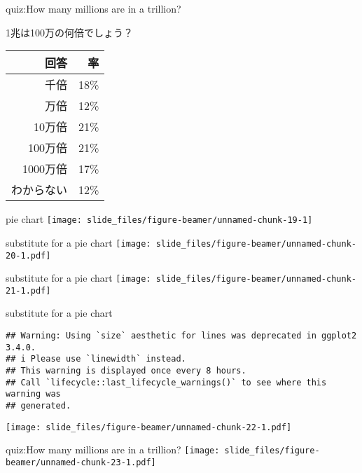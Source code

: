 \documentclass[
  ignorenonframetext,
]{beamer}
\begin{document}
\begin{frame}{quiz:How many millions are in a trillion?}
\protect\hypertarget{quizhow-many-millions-are-in-a-trillion-1}{}
\LARGE

1兆は100万の何倍でしょう？

\begin{tabular}{rr}\toprule
回答&率\\\midrule
千倍&18\%\\
万倍&12\%\\
10万倍&21\%\\
100万倍&21\%\\
1000万倍&17\%\\
わからない&12\%\\\bottomrule
\end{tabular}
\end{frame}

\begin{frame}{pie chart}
\protect\hypertarget{pie-chart}{}
\texttt{[image: slide\_files/figure-beamer/unnamed-chunk-19-1]}
\end{frame}

\begin{frame}{substitute for a pie chart}
\protect\hypertarget{substitute-for-a-pie-chart}{}
\texttt{[image: slide\_files/figure-beamer/unnamed-chunk-20-1.pdf]}
\end{frame}

\begin{frame}{substitute for a pie chart}
\protect\hypertarget{substitute-for-a-pie-chart-1}{}
\texttt{[image: slide\_files/figure-beamer/unnamed-chunk-21-1.pdf]}
\end{frame}

\begin{frame}[fragile]{substitute for a pie chart}
\protect\hypertarget{substitute-for-a-pie-chart-2}{}
\begin{verbatim}
## Warning: Using `size` aesthetic for lines was deprecated in ggplot2 3.4.0.
## i Please use `linewidth` instead.
## This warning is displayed once every 8 hours.
## Call `lifecycle::last_lifecycle_warnings()` to see where this warning was
## generated.
\end{verbatim}

\texttt{[image: slide\_files/figure-beamer/unnamed-chunk-22-1.pdf]}
\end{frame}

\begin{frame}{quiz:How many millions are in a trillion?}
\protect\hypertarget{quizhow-many-millions-are-in-a-trillion-2}{}
\texttt{[image: slide\_files/figure-beamer/unnamed-chunk-23-1.pdf]}
\end{frame}
\end{document}
